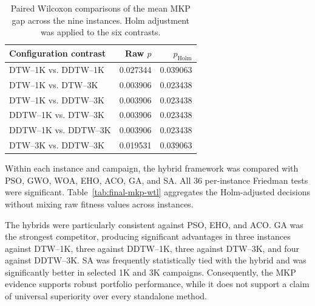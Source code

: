 \begin{table}[htbp]
\centering
\caption{Paired Wilcoxon comparisons of the mean MKP gap across the nine
instances. Holm adjustment was applied to the six contrasts.}
\label{tab:final-mkp-config-tests}
\begin{tabular}{lrr}
\toprule
Configuration contrast & Raw $p$ & $p_{\mathrm{Holm}}$ \\
\midrule
DTW--1K vs. DDTW--1K   & 0.027344 & 0.039063 \\
DTW--1K vs. DTW--3K    & 0.003906 & 0.023438 \\
DTW--1K vs. DDTW--3K   & 0.003906 & 0.023438 \\
DDTW--1K vs. DTW--3K   & 0.003906 & 0.023438 \\
DDTW--1K vs. DDTW--3K  & 0.003906 & 0.023438 \\
DTW--3K vs. DDTW--3K   & 0.019531 & 0.039063 \\
\bottomrule
\end{tabular}
\end{table}

Within each instance and campaign, the hybrid framework was compared with
PSO, GWO, WOA, EHO, ACO, GA, and SA. All 36 per-instance Friedman tests were
significant. Table~\ref{tab:final-mkp-wtl} aggregates the Holm-adjusted
decisions without mixing raw fitness values across instances.

\begin{table}[htbp]
\centering
\caption{MKP wins/ties/losses of each hybrid configuration against the seven
standalone metaheuristics over nine instances. Each cell is W/T/L from the
hybrid perspective.}
\label{tab:final-mkp-wtl}
\small
{}
\end{table}

The hybrids were particularly consistent against PSO, EHO, and ACO. GA was
the strongest competitor, producing significant advantages in three
instances against DTW--1K, three against DDTW--1K, three against DTW--3K, and
four against DDTW--3K. SA was frequently statistically tied with the hybrid
and was significantly better in selected 1K and 3K campaigns. Consequently,
the MKP evidence supports robust portfolio performance, while it does not
support a claim of universal superiority over every standalone method.

